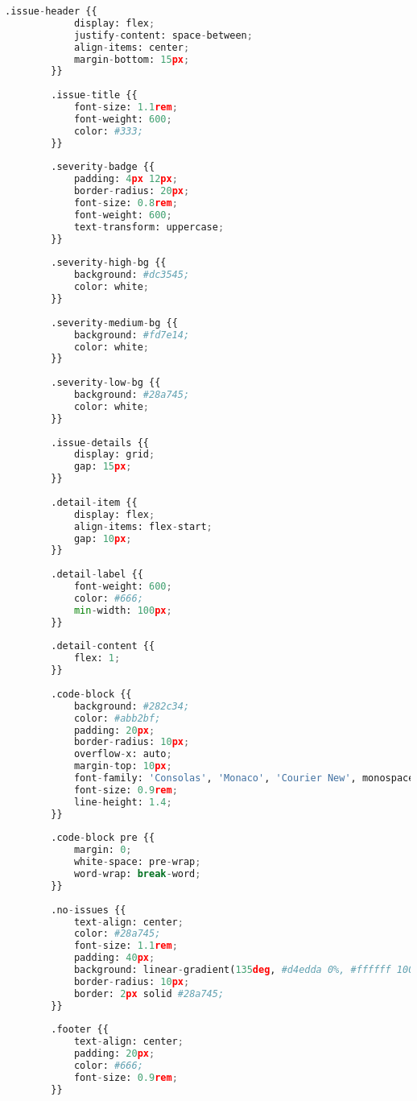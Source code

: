 \begin{lstlisting}[language=python, caption={Contenido completo del script ai\_analyzer.py.}, label={lst:python_script}]
        .issue-header {{
            display: flex;
            justify-content: space-between;
            align-items: center;
            margin-bottom: 15px;
        }}
        
        .issue-title {{
            font-size: 1.1rem;
            font-weight: 600;
            color: #333;
        }}
        
        .severity-badge {{
            padding: 4px 12px;
            border-radius: 20px;
            font-size: 0.8rem;
            font-weight: 600;
            text-transform: uppercase;
        }}
        
        .severity-high-bg {{
            background: #dc3545;
            color: white;
        }}
        
        .severity-medium-bg {{
            background: #fd7e14;
            color: white;
        }}
        
        .severity-low-bg {{
            background: #28a745;
            color: white;
        }}
        
        .issue-details {{
            display: grid;
            gap: 15px;
        }}
        
        .detail-item {{
            display: flex;
            align-items: flex-start;
            gap: 10px;
        }}
        
        .detail-label {{
            font-weight: 600;
            color: #666;
            min-width: 100px;
        }}
        
        .detail-content {{
            flex: 1;
        }}
        
        .code-block {{
            background: #282c34;
            color: #abb2bf;
            padding: 20px;
            border-radius: 10px;
            overflow-x: auto;
            margin-top: 10px;
            font-family: 'Consolas', 'Monaco', 'Courier New', monospace;
            font-size: 0.9rem;
            line-height: 1.4;
        }}
        
        .code-block pre {{
            margin: 0;
            white-space: pre-wrap;
            word-wrap: break-word;
        }}
        
        .no-issues {{
            text-align: center;
            color: #28a745;
            font-size: 1.1rem;
            padding: 40px;
            background: linear-gradient(135deg, #d4edda 0%, #ffffff 100%);
            border-radius: 10px;
            border: 2px solid #28a745;
        }}
        
        .footer {{
            text-align: center;
            padding: 20px;
            color: #666;
            font-size: 0.9rem;
        }}
        

\end{lstlisting}
